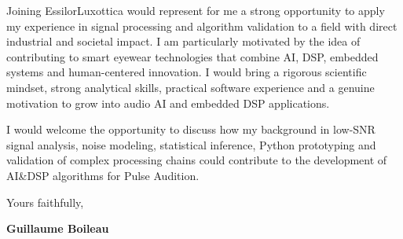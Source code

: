 \documentclass[11pt,a4paper]{altacv}
\begin{document}
{Joining EssilorLuxottica would represent for me a strong opportunity to apply my experience in signal processing and algorithm validation to a field with direct industrial and societal impact. I am particularly motivated by the idea of contributing to smart eyewear technologies that combine AI, DSP, embedded systems and human-centered innovation. I would bring a rigorous scientific mindset, strong analytical skills, practical software experience and a genuine motivation to grow into audio AI and embedded DSP applications.

I would welcome the opportunity to discuss how my background in low-SNR signal analysis, noise modeling, statistical inference, Python prototyping and validation of complex processing chains could contribute to the development of AI\&DSP algorithms for Pulse Audition.

Yours faithfully,

\textbf{Guillaume Boileau}

}
\end{document}

